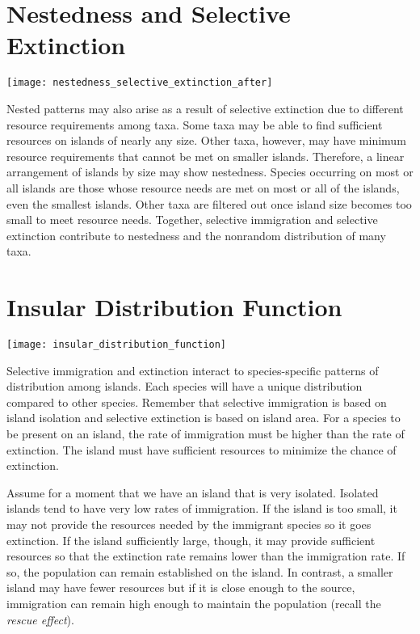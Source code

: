 \documentclass[letterpaper]{tufte-handout}
\begin{document}
\section{Nestedness and Selective Extinction}
\begin{marginfigure}%
	\texttt{[image: nestedness\_selective\_extinction\_after]}
\end{marginfigure} 

Nested patterns may also arise as a result of selective extinction due to different resource requirements among taxa.  Some taxa may be able to find sufficient resources on islands of nearly any size.  Other taxa, however, may have minimum resource requirements that cannot be met on smaller islands.  Therefore, a linear arrangement of islands by size may show nestedness.  Species occurring on most or all islands are those whose resource needs are met on most or all of the islands, even the smallest islands.  Other taxa are filtered out once island size becomes too small to meet resource needs.  Together, selective immigration and selective extinction contribute to nestedness and the nonrandom distribution of many taxa. 

\section{Insular Distribution Function}
\begin{marginfigure}%
	\texttt{[image: insular\_distribution\_function]}
\end{marginfigure} 

Selective immigration and extinction interact to species-specific patterns of distribution among islands. Each species will have a unique distribution compared to other species.  Remember that selective immigration is based on island isolation and selective extinction is based on island area.  For a species to be present on an island, the rate of immigration must be higher than the rate of extinction.  The island must have sufficient resources to minimize the chance of extinction.

 Assume for a moment that we have an island that is very isolated.  Isolated islands tend to have very low rates of immigration.  If the island is too small, it may not provide the resources needed by the immigrant species so it goes extinction.  If the island sufficiently large, though, it may provide sufficient resources so that the extinction rate remains lower than the immigration rate. If so, the population can remain established on the island. In contrast, a smaller island may have fewer resources but if it is close enough to the source, immigration can remain high enough to maintain the population (recall the \textit{rescue effect}). 
 
\end{document}
